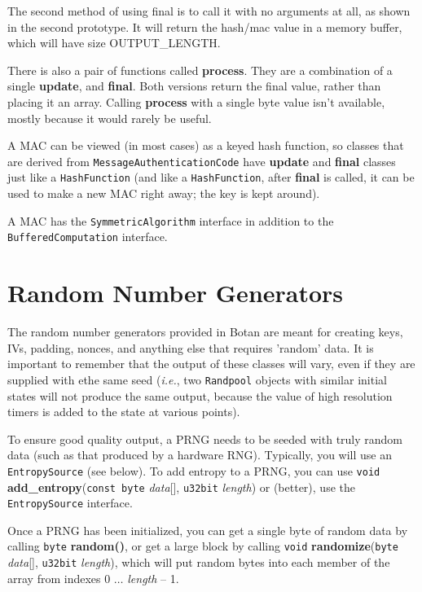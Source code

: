 \documentclass{article}
\newcommand{\function}[1]{\textbf{#1}}
\newcommand{\type}[1]{\texttt{#1}}
\renewcommand{\arg}[1]{\textsl{#1}}
\newcommand{\ie}[0]{\emph{i.e.}}
\begin{document}
The second method of using final is to call it with no arguments at all, as
shown in the second prototype. It will return the hash/mac value in a memory
buffer, which will have size OUTPUT\_LENGTH.

There is also a pair of functions called \function{process}. They are
a combination of a single \function{update}, and \function{final}.
Both versions return the final value, rather than placing it an
array. Calling \function{process} with a single byte value isn't
available, mostly because it would rarely be useful.

A MAC can be viewed (in most cases) as a keyed hash function, so
classes that are derived from \type{MessageAuthenticationCode} have
\function{update} and \function{final} classes just like a
\type{HashFunction} (and like a \type{HashFunction}, after
\function{final} is called, it can be used to make a new MAC right
away; the key is kept around).

A MAC has the \type{SymmetricAlgorithm} interface in addition to the
\type{BufferedComputation} interface.

\section{Random Number Generators}

The random number generators provided in Botan are meant for creating
keys, IVs, padding, nonces, and anything else that requires 'random'
data. It is important to remember that the output of these classes
will vary, even if they are supplied with ethe same seed (\ie, two
\type{Randpool} objects with similar initial states will not produce
the same output, because the value of high resolution timers is added
to the state at various points).

To ensure good quality output, a PRNG needs to be seeded with truly random data
(such as that produced by a hardware RNG). Typically, you will use an
\type{EntropySource} (see below). To add entropy to a PRNG, you can use
\type{void} \function{add\_entropy}(\type{const byte} \arg{data}[],
\type{u32bit} \arg{length}) or (better), use the \type{EntropySource}
interface.

Once a PRNG has been initialized, you can get a single byte of random data by
calling \type{byte} \function{random()}, or get a large block by calling
\type{void} \function{randomize}(\type{byte} \arg{data}[], \type{u32bit}
\arg{length}), which will put random bytes into each member of the array from
indexes 0 $\ldots$ \arg{length} -- 1.
\end{document}
